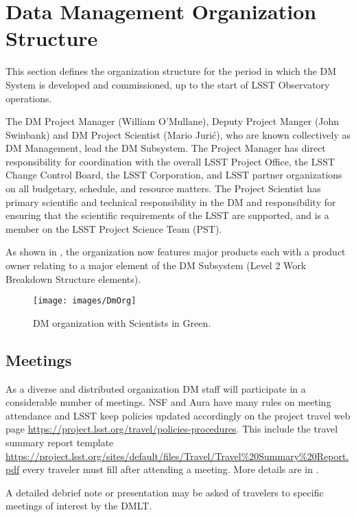\section{Data Management Organization Structure}

This section defines the organization structure for the period in which the DM System is developed and commissioned, up to the start of LSST Observatory operations.

The DM Project Manager (William O'Mullane), Deputy Project Manger (John Swinbank) and DM Project Scientist (Mario Juri\'c), who are known collectively as DM Management, lead the DM Subsystem.
The Project Manager has direct responsibility for coordination with the overall LSST Project Office, the LSST Change Control Board, the LSST Corporation, and LSST partner organizations on all budgetary, schedule, and resource matters.
The Project Scientist has primary scientific and technical responsibility in the DM and responsibility for ensuring that the scientific requirements of the LSST are supported, and is a member on the LSST Project Science Team (PST).

As shown in , the organization now features  major products  each with a product owner
relating to a major element of the DM Subsystem (Level 2 Work Breakdown Structure elements).

\begin{figure}[htbp]
\begin{center}
 \texttt{[image: images/DmOrg]}
\caption{DM organization with Scientists in Green. \label{fig:dmorg}}
\end{center}
\end{figure}


\subsection {Meetings } \label{sect:meetings}
As a diverse and distributed organization DM staff will participate in a considerable number of meetings.
NSF and Aura have many rules on meeting attendance and LSST keep policies updated accordingly on the project travel web page  \url{https://project.lsst.org/travel/policies-procedures}. This include the travel summary report template \url{https://project.lsst.org/sites/default/files/Travel/Travel%20Summary%20Report.pdf} every traveler must fill after attending a meeting.  More details are in \citeds{Document-13760}.

A detailed debrief note or presentation may be asked of travelers to specific meetings of interest by the DMLT.


